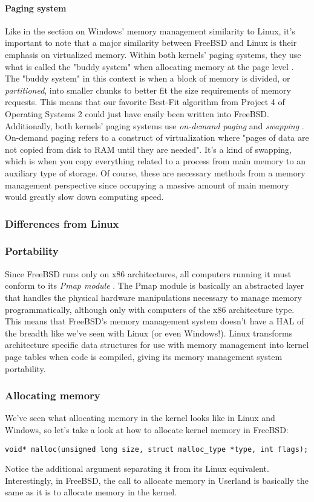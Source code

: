 \documentclass[letterpaper,10pt,titlepage]{article}
\begin{document}
\paragraph{Paging system}
Like in the section on Windows' memory management similarity to Linux, it's important to note that a major similarity between FreeBSD and Linux is their emphasis on virtualized memory. Within both kernels' paging systems, they use what is called the "buddy system" when allocating memory at the page level \cite{freeBSD1} \cite{linux2}. The "buddy system" in this context is when a block of memory is divided, or \emph{partitioned}, into smaller chunks to better fit the size requirements of memory requests. This means that our favorite Best-Fit algorithm from Project 4 of Operating Systems 2 could just have easily been written into FreeBSD. Additionally, both kernels' paging systems use \emph{on-demand paging} and \emph{swapping} \cite{freeBSD2} \cite{linux}. On-demand paging refers to a construct of virtualization where "pages of data are not copied from disk to RAM until they are needed". It's a kind of swapping, which is when you copy everything related to a process from main memory to an auxiliary type of storage. Of course, these are necessary methods from a memory management perspective since occupying a massive amount of main memory would greatly slow down computing speed. 

% 
%
%
\subsubsection{Differences from Linux}
\subsubsection{Portability}
Since FreeBSD runs only on x86 architectures, all computers running it must conform to its \emph{Pmap module} \cite{freeBSD1}. The Pmap module is basically an abstracted layer that handles the physical hardware manipulations necessary to manage memory programmatically, although only with computers of the x86 architecture type. This means that FreeBSD's memory management system doesn't have a HAL of the breadth like we've seen with Linux (or even Windows!). Linux transforms architecture specific data structures for use with memory management into kernel page tables when code is compiled, giving its memory management system portability. 
\subsubsection{Allocating memory}
We've seen what allocating memory in the kernel looks like in Linux and Windows, so let's take a look at how to allocate kernel memory in FreeBSD: \cite{freeBSD2}
\begin{lstlisting}
void* malloc(unsigned long size, struct malloc_type *type, int flags);
\end{lstlisting}
Notice the additional argument separating it from its Linux equivalent. Interestingly, in FreeBSD, the call to allocate memory in Userland is basically the same as it is to allocate memory in the kernel. 
\end{document}
